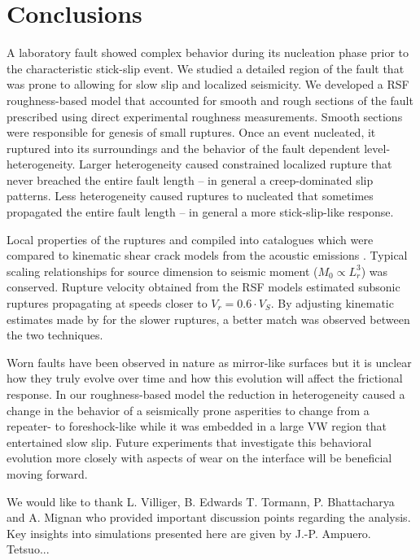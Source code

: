 \documentclass[preprint,1p, 10pt,authoryear]{elsarticle}
\begin{document}
\section{Conclusions}

A laboratory fault showed complex behavior during its nucleation phase prior to the characteristic stick-slip event.  We studied a detailed region of the fault that was prone to allowing for slow slip and localized seismicity.  We developed a RSF roughness-based model that accounted for smooth and rough sections of the fault prescribed using direct experimental roughness measurements. Smooth sections were responsible for genesis of small ruptures.  Once an event nucleated, it ruptured into its surroundings and the behavior of the fault dependent level-heterogeneity.  Larger heterogeneity caused constrained localized rupture that never breached the entire fault length -- in general a creep-dominated slip patterns. Less heterogeneity caused ruptures to nucleated that sometimes propagated the entire fault length -- in general a more stick-slip-like response.  

Local properties of the ruptures and compiled into catalogues which were compared to kinematic shear crack models from the acoustic emissions \citep{Selvadurai2019}.  Typical scaling relationships for source dimension to seismic moment ($M_{0} \propto L^{3}_{r}$) was conserved.  Rupture velocity obtained from the RSF models estimated subsonic ruptures propagating at speeds closer to $V_r = 0.6\cdot V_{S}$.  By adjusting kinematic estimates made by \citet{Selvadurai2019} for the slower ruptures, a better match was observed between the two techniques.

Worn faults have been observed in nature as mirror-like surfaces but it is unclear how they truly evolve over time and how this evolution will affect the frictional response.  In our roughness-based model the reduction in heterogeneity caused a change in the behavior of a seismically prone asperities to change from a repeater- to foreshock-like while it was embedded in a large VW region that entertained slow slip.  Future experiments that investigate this behavioral evolution more closely with aspects of wear on the interface will be beneficial moving forward. 

\acknowledgments
We would like to thank L. Villiger, B. Edwards T. Tormann, P. Bhattacharya and A. Mignan who provided important discussion points regarding the analysis. Key insights into simulations presented here are given by J.-P. Ampuero. Tetsuo...
\end{document}

